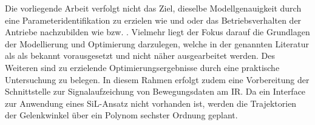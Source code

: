 %
Die vorliegende Arbeit verfolgt nicht das Ziel, dieselbe Modellgenauigkeit durch eine Parameteridentifikation zu erzielen wie \cite{Pellicciari.2011} und \cite{Gattringer.2013} oder das Betriebsverhalten der Antriebe nachzubilden wie \cite{Eggers.2019} bzw. \cite{Ziaukas.2017}. Vielmehr liegt der Fokus darauf die Grundlagen der Modellierung und Optimierung darzulegen, welche in der genannten Literatur als als bekannt vorausgesetzt und nicht näher ausgearbeitet werden. 
Des Weiteren sind zu erzielende Optimierungsergebnisse durch eine praktische Untersuchung zu belegen. In diesem Rahmen erfolgt zudem eine Vorbereitung der Schnittstelle zur Signalaufzeichung von Bewegungsdaten am IR. Da ein Interface zur Anwendung eines SiL-Ansatz nicht vorhanden ist, werden die Trajektorien der Gelenkwinkel über ein Polynom sechster Ordnung geplant. 